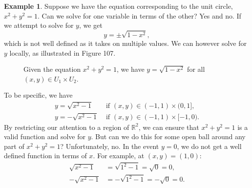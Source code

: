 \documentclass{article}
\newcommand{\R}{\mathbb{R}}
\theoremstyle{definition}
\newtheorem{example}{Example}[section]
\begin{document}
	\begin{example}
		Suppose we have the equation corresponding to the unit circle, $ x^2 + y^2 = 1 $. Can we solve for one variable in terms of the other? Yes and no. If we attempt to solve for $ y $, we get 
		$$ y=\pm \sqrt{1-x^2},$$ which is not well defined as it takes on multiple values. We can however solve for $ y $ locally, as illustrated in Figure 107. 
		\begin{figure}[h!]
			\centering
			\caption{Given the equation $ x^2+y^2=1 $, we have $ y=\sqrt{1-x^2} $ for all $ (x,y)\in U_1\times U_2 $. }
		\end{figure}
		To be specific, we have 
		\begin{align*}
			y=\sqrt{x^2-1}&\text{ if }(x,y)\in (-1,1)\times(0,1],\\
			y=-\sqrt{x^2-1}&\text{ if }(x,y)\in (-1,1)\times[-1,0).  
		\end{align*}
		By restricting our attention to a region of $ \R^2 $, we can ensure that $ x^2+y^2=1 $ is a valid function and solve for $ y $. But can we do this for some open ball around any part of $ x^2+y^2=1 $? Unfortunately, no. In the event $ y = 0 $, we do not get a well defined function in terms of $ x $. For example, at $ (x,y)=(1,0) $:
		\begin{align*}
			\sqrt{x^2-1} &= \sqrt{1^2 - 1}=\sqrt{0}=0,\\
			-\sqrt{x^2-1} &= -\sqrt{1^2 - 1}=-\sqrt{0}=0.
		\end{align*}	 
		

\end{example}
\end{document}
